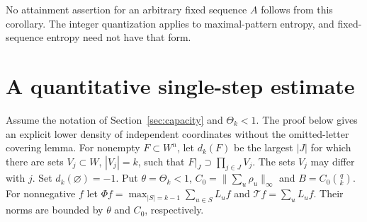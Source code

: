 \documentclass[11pt,reqno]{amsart}
\numberwithin{equation}{section}
\theoremstyle{definition}
\theoremstyle{definition}
\begin{document}
No attainment assertion for an arbitrary fixed sequence $A$ follows
from this corollary. The integer quantization applies to maximal-pattern
entropy, and fixed-sequence entropy need not have that form.

\section{A quantitative single-step estimate}\label{app:weighted}
Assume the notation of Section~\ref{sec:capacity} and
$\Theta_k<1$. The proof below gives an explicit lower density of
independent coordinates without the omitted-letter covering lemma. For nonempty $F\subset W^n$, let $d_k(F)$ be the largest
$|J|$ for which there are sets $V_j\subset W$, $|V_j|=k$, such that
$F|_J\supset\prod_{j\in J}V_j$. The sets $V_j$ may differ with $j$.
Set $d_k(\varnothing)=-1$. Put $\theta=\Theta_k<1$, $C_0=\|\sum_u\rho_u\|_\infty$ and
$B=C_0\binom qk$. For nonnegative $f$ let
$\Phi f=\max_{|S|=k-1}\sum_{u\in S}L_uf$ and
$\mathcal Tf=\sum_uL_uf$. Their norms are bounded by $\theta$
and $C_0$, respectively.
\end{document}
